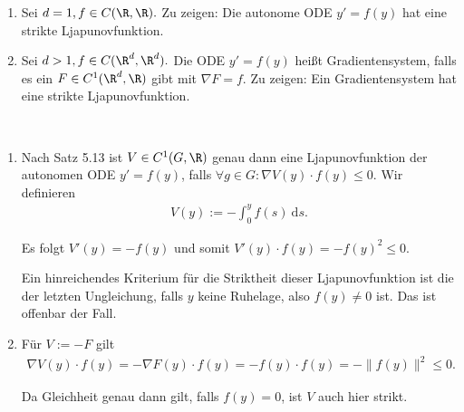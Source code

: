 \begin{exercise}[Gradientensysteme]
\phantom{}
\begin{enumerate}[label = \textbf{\alph*)}]
  \item Sei $d = 1, f \in C(\R, \R).$ Zu zeigen: Die autonome ODE $y' = f(y)$ hat eine strikte Ljapunovfunktion.
  \item Sei $d > 1, f \in C(\R^d, \R^d).$ Die ODE $y' = f(y)$ heißt Gradientensystem, falls es ein $F \in C^1(\R^d, \R)$ gibt mit $\nabla F = f$. Zu zeigen: Ein Gradientensystem hat eine strikte Ljapunovfunktion.
\end{enumerate}
\end{exercise}

\begin{solution}
\leavevmode \\
\begin{enumerate}[label = \textbf{\alph*)}]
  \item Nach Satz 5.13 ist $V \in C^1(G, \R)$ genau dann eine Ljapunovfunktion der autonomen ODE $y' = f(y)$, falls $\forall g \in G: \nabla V(y) \cdot f(y) \leq 0$. Wir definieren
  \begin{align}
      V(y) := -\int_0^y f(s)~ \mathrm{d}s.
  \end{align}

  Es folgt $V'(y) = -f(y)$ und somit $V'(y) \cdot f(y) = -f(y)^2 \leq 0.$

  Ein hinreichendes Kriterium für die Striktheit dieser Ljapunovfunktion ist die der letzten Ungleichung, falls $y$ keine Ruhelage, also $f(y) \neq 0$ ist. Das ist offenbar der Fall.
  \item Für $V := -F$ gilt
  \begin{align}
      \nabla V(y) \cdot f(y) = - \nabla F(y) \cdot f(y) = - f(y) \cdot f(y) = - \| f(y) \|^2 \leq 0.
  \end{align}

  Da Gleichheit genau dann gilt, falls $f(y) = 0$, ist $V$ auch hier strikt.
\end{enumerate}
\end{solution}

